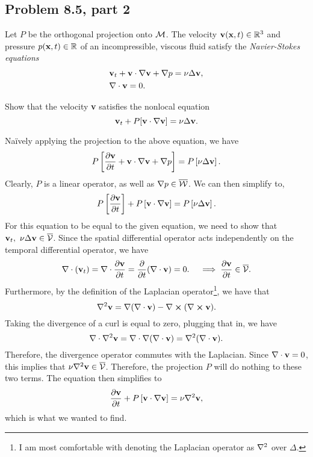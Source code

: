 \newpage
\subsection{Problem 8.5, part 2}
\hop
Let $P$ be the orthogonal projection onto $\mathcal{M}$. The velocity $\textbf{v}(\textbf{x}, t) \in \mathbb{R}^3$ and pressure $p(\textbf{x}, t) \in \mathbb{R}$ of an incompressible, viscous fluid satisfy the \textit{Navier-Stokes equations}
\vspace{-4mm}\begin{align*}
    &\textbf{v}_t + \textbf{v} \cdot \nabla \textbf{v} + \nabla p = \nu \Delta \textbf{v},\\
    &\nabla \cdot \textbf{v} = 0.
\end{align*}\vspace{-10mm}

Show that the velocity \textbf{v} satisfies the nonlocal equation
\[\textbf{v}_t + P[\textbf{v}\cdot \nabla \textbf{v}] = \nu \Delta \textbf{v}.\]
\vspace{-16mm}
\partbreak
\vspace{-3mm}
\begin{solution}

    Na\"ively applying the projection to the above equation, we have 
    \[P\left[ \frac{\partial \textbf{v}}{\partial t} + \textbf{v} \cdot \nabla \textbf{v} + \nabla p\right] = P\left[ \nu \Delta\textbf{v}\right].\]
    Clearly, $P$ is a linear operator, as well as $\nabla p \in \overline{\mathcal{W}}$. We can then simplify to,
    \[P\left[ \frac{\partial \textbf{v}}{\partial t}\right] + P\left[\textbf{v} \cdot \nabla \textbf{v} \right] = P\left[ \nu \Delta\textbf{v}\right].\]
    For this equation to be equal to the given equation, we need to show that $\textbf{v}_t, \ \nu\Delta \textbf{v} \in \overline{\mathcal{V}}$. Since the spatial differential operator acts independently on the temporal differential operator, we have 
    \[\nabla \cdot (\textbf{v}_t) = \nabla \cdot \frac{\partial \textbf{v}}{\partial t} = \frac{\partial}{\partial t}(\nabla \cdot \textbf{v}) = 0. \quad \implies \frac{\partial \textbf{v}}{\partial t} \in \overline{\mathcal{V}}.\]
    Furthermore, by the definition of the Laplacian operator\footnote{I am most comfortable with denoting the Laplacian operator as $\nabla^2$ over $\Delta$.}, we have that 
    \[\nabla^2 \textbf{v} = \nabla (\nabla \cdot \textbf{v}) - \nabla \cross (\nabla \cross \textbf{v}).\]
    Taking the divergence of a curl is equal to zero, plugging that in, we have
    \[\nabla \cdot \nabla^2\textbf{v} = \nabla \cdot \nabla (\nabla \cdot \textbf{v}) = \nabla^2(\nabla \cdot \textbf{v}).\]
    Therefore, the divergence operator commutes with the Laplacian. Since $\nabla \cdot \textbf{v} = 0$, this implies that $\nu \nabla^2 \textbf{v} \in \overline{\mathcal{V}}$. Therefore, the projection $P$ will do nothing to these two terms. The equation then simplifies to 
    \[\frac{\partial \textbf{v}}{\partial t} + P\left[ \textbf{v}\cdot \nabla \textbf{v}\right] = \nu \nabla^2 \textbf{v},\]
    which is what we wanted to find.
\end{solution}


